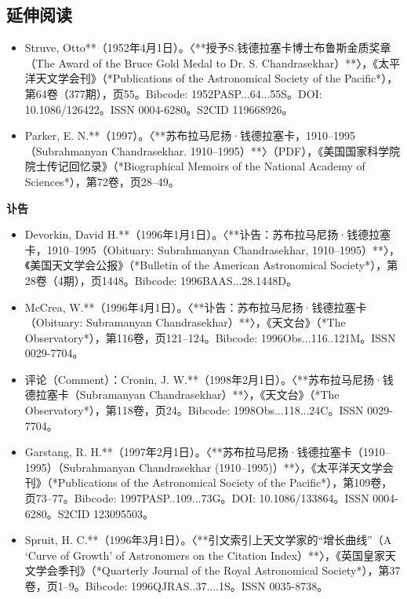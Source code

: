 \subsection{延伸阅读}
\begin{itemize}
\item Struve, Otto**（1952年4月1日）。〈**授予S.钱德拉塞卡博士布鲁斯金质奖章（The Award of the Bruce Gold Medal to Dr. S. Chandrasekhar）**〉，《太平洋天文学会刊》（*Publications of the Astronomical Society of the Pacific*），第64卷（377期），页55。Bibcode: 1952PASP...64...55S。DOI: 10.1086/126422。ISSN 0004-6280。S2CID 119668926。
\item Parker, E. N.**（1997）。〈**苏布拉马尼扬·钱德拉塞卡，1910–1995（Subrahmanyan Chandrasekhar. 1910–1995）**〉（PDF），《美国国家科学院院士传记回忆录》（*Biographical Memoirs of the National Academy of Sciences*），第72卷，页28–49。
\end{itemize}
\textbf{讣告}
\begin{itemize}
\item Devorkin, David H.**（1996年1月1日）。〈**讣告：苏布拉马尼扬·钱德拉塞卡，1910–1995（Obituary: Subrahmanyan Chandrasekhar, 1910–1995）**〉，《美国天文学会公报》（*Bulletin of the American Astronomical Society*），第28卷（4期），页1448。Bibcode: 1996BAAS...28.1448D。
\item McCrea, W.**（1996年4月1日）。〈**讣告：苏布拉马尼扬·钱德拉塞卡（Obituary: Subramanyan Chandrasekhar）**〉，《天文台》（*The Observatory*），第116卷，页121–124。Bibcode: 1996Obs...116..121M。ISSN 0029-7704。
\item 评论（Comment）：Cronin, J. W.**（1998年2月1日）。〈**苏布拉马尼扬·钱德拉塞卡（Subramanyan Chandrasekhar）**〉，《天文台》（*The Observatory*），第118卷，页24。Bibcode: 1998Obs...118...24C。ISSN 0029-7704。
\item Garstang, R. H.**（1997年2月1日）。〈**苏布拉马尼扬·钱德拉塞卡（1910–1995）（Subrahmanyan Chandrasekhar (1910–1995)）**〉，《太平洋天文学会刊》（*Publications of the Astronomical Society of the Pacific*），第109卷，页73–77。Bibcode: 1997PASP..109...73G。DOI: 10.1086/133864。ISSN 0004-6280。S2CID 123095503。
\item Spruit, H. C.**（1996年3月1日）。〈**引文索引上天文学家的“增长曲线”（A ‘Curve of Growth’ of Astronomers on the Citation Index）**〉，《英国皇家天文学会季刊》（*Quarterly Journal of the Royal Astronomical Society*），第37卷，页1–9。Bibcode: 1996QJRAS..37....1S。ISSN 0035-8738。
\end{itemize}
